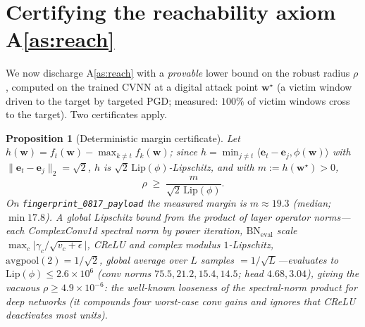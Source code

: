 \documentclass[11pt]{article}
\newtheorem{proposition}[theorem]{Proposition}
\theoremstyle{definition}
\newcommand{\norm}[1]{\lVert #1 \rVert}
\newcommand{\bw}{\bm{w}}
\begin{document}
\section{Certifying the reachability axiom A\ref{as:reach}}\label{sec:certify}

We now discharge A\ref{as:reach} with a \emph{provable} lower bound on the robust radius
$\rho$, computed on the trained CVNN at a digital attack point $\bw^\star$ (a victim window
driven to the target by targeted PGD; measured: $100\%$ of victim windows cross to the target).
Two certificates apply.

\begin{proposition}[Deterministic margin certificate]\label{prop:margin}
Let $h(\bw)=f_t(\bw)-\max_{k\neq t}f_k(\bw)$; since $h=\min_{j\neq t}\langle \bm e_t-\bm e_j,\phi(\bw)\rangle$
with $\norm{\bm e_t-\bm e_j}_2=\sqrt2$, $h$ is $\sqrt2\,\mathrm{Lip}(\phi)$-Lipschitz, and with
$m:=h(\bw^\star)>0$,
\[
  \rho \;\ge\; \frac{m}{\sqrt2\,\mathrm{Lip}(\phi)} .
\]
On \texttt{fingerprint\_0817\_payload} the measured margin is $m\approx19.3$ (median; $\min
17.8$). A \emph{global} Lipschitz bound from the product of layer operator norms---each
ComplexConv1d spectral norm by power iteration, $\mathrm{BN_{eval}}$ scale
$\max_c\lvert\gamma_c/\sqrt{v_c+\epsilon}\rvert$, CReLU and complex modulus $1$-Lipschitz,
$\mathrm{avgpool}(2)=1/\sqrt2$, global average over $L$ samples $=1/\sqrt L$---evaluates to
$\mathrm{Lip}(\phi)\le 2.6\times10^{6}$ (conv norms $75.5,21.2,15.4,14.5$; head $4.68,3.04$),
giving the \emph{vacuous} $\rho\ge 4.9\times10^{-6}$: the well-known looseness of the
spectral-norm product for deep networks (it compounds four worst-case conv gains and ignores
that CReLU deactivates most units).


\end{proposition}
\end{document}
